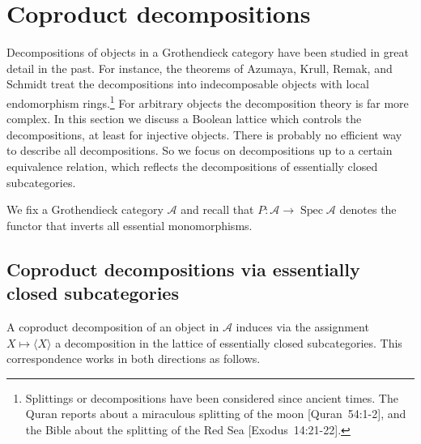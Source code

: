\documentclass[a4paper]{amsart}
\theoremstyle{plain}
\theoremstyle{definition}
\theoremstyle{remark}
\numberwithin{equation}{section}
\newcommand{\Spec}{\operatorname{Spec}}
\def\A{\mathcal A}
\begin{document}
\section{Coproduct decompositions}\label{se:decomp}

Decompositions of objects in a Grothendieck category have been studied in great
detail in the past. For instance, the theorems of Azumaya, Krull,
Remak, and Schmidt treat the decompositions into indecomposable
objects with local endomorphism rings.\footnote{Splittings or
  decompositions have been considered since ancient times. The Quran
  reports about a miraculous splitting of the moon [Quran~54:1-2], and
  the Bible about the splitting of the Red Sea [Exodus~14:21-22].} For
arbitrary objects the decomposition theory is far more complex.  In
this section we discuss a Boolean lattice which controls the
decompositions, at least for injective objects. There is probably no
efficient way to describe all decompositions. So we focus on
decompositions up to a certain equivalence relation, which reflects
the decompositions of essentially closed subcategories.

We fix a Grothendieck category $\A$ and recall that $P\colon\A\to\Spec\A$
denotes the functor that inverts all essential monomorphisms.


\subsection*{Coproduct decompositions via essentially closed subcategories}

A coproduct decomposition of an object in $\A$ induces via the
assignment $X\mapsto \langle X\rangle$ a decomposition in the lattice
of essentially closed subcategories. This correspondence works in both
directions as follows.
\end{document}
